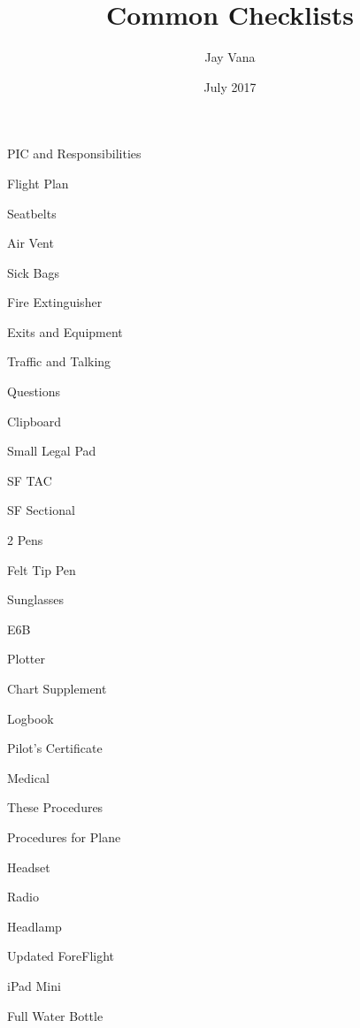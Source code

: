 \documentclass{article}
\title{Common Checklists}
\author{Jay Vana}
\date{July 2017}
\begin{document}
  


  \begin{multicols*}{2}


    \begin{packlist}
      \item PIC and Responsibilities
      \item Flight Plan
      \item Seatbelts
      \item Air Vent
      \item Sick Bags
      \item Fire Extinguisher
      \item Exits and Equipment
      \item Traffic and Talking
      \item Questions
    \end{packlist}


    \begin{packlist}
      \item Clipboard
      \item Small Legal Pad
      \item SF TAC
      \item SF Sectional
      \item 2 Pens
      \item Felt Tip Pen
      \item Sunglasses
      \item E6B
      \item Plotter
      \item Chart Supplement
      \item Logbook
      \item Pilot's Certificate
      \item Medical
      \item These Procedures
      \item Procedures for Plane
      \item Headset
      \item Radio
      \item Headlamp
      \item Updated ForeFlight
      \item iPad Mini
      \item Full Water Bottle
    \end{packlist}


\end{multicols*}
\end{document}
